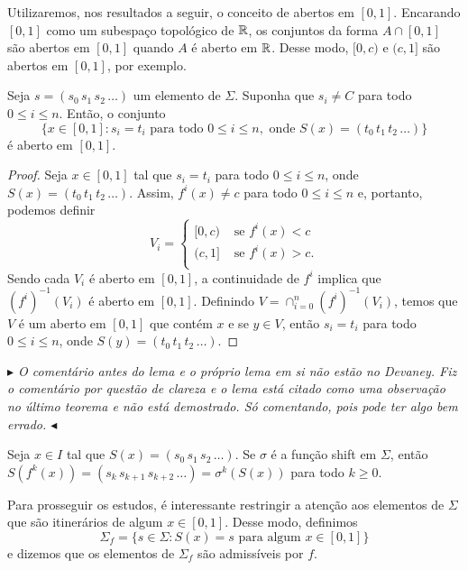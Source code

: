 Utilizaremos, nos resultados a seguir, o conceito de abertos em $[0, 1]$. Encarando $[0, 1]$ como um subespaço topológico de $\mathbb{R}$, os conjuntos da forma $A \cap [0, 1]$ são abertos em $[0, 1]$ quando $A$ é aberto em $\mathbb{R}$. Desse modo, $[0, c)$ e $(c, 1]$ são abertos em $[0, 1]$, por exemplo.

\begin{lemma}
Seja $s = (s_0\, s_1\, s_2\, \dots)$ um elemento de $\Sigma$. Suponha que $s_i \neq C$ para todo $0 \leq i \leq n$. Então, o conjunto
$$\{ x \in [0, 1] : s_i = t_i \textrm{ para todo } 0 \leq i \leq n, \text{ onde } S(x) = (t_0\, t_1\, t_2\, \dots) \}$$
é aberto em $[0, 1]$.
\end{lemma}

\begin{proof}
Seja $x \in [0, 1]$ tal que $s_i = t_i$ para todo $0 \leq i \leq n$, onde $S(x) = (t_0\, t_1\, t_2\, \dots)$. Assim, $f^i(x) \neq c$ para todo $0 \leq i \leq n$ e, portanto, podemos definir
\[ V_i = 
\begin{cases} 
  [0, c) & \textrm{ se } f^i(x) < c \\
  (c, 1] & \textrm{ se } f^i(x) > c. \\
\end{cases}
\]
Sendo cada $V_i$ é aberto em $[0, 1]$, a continuidade de $f^i$ implica que $(f^i)^{-1}(V_i)$ é aberto em $[0, 1]$. Definindo $V = \cap_{i=0}^n (f^i)^{-1}(V_i)$, temos que $V$ é um aberto em $[0, 1]$ que contém $x$ e se $y \in V$, então $s_i = t_i$ para todo $0 \leq i \leq n$, onde $S(y) = (t_0\, t_1\, t_2\, \dots)$.  
\end{proof}

\textit{$\blacktriangleright$ O comentário antes do lema e o próprio lema em si não estão no Devaney. Fiz o comentário por questão de clareza e o lema está citado como uma observação no último teorema e não está demostrado. Só comentando, pois pode ter algo bem errado. $\blacktriangleleft$}

Seja $x \in I$ tal que $S(x) = (s_0\, s_1\, s_2\, \dots)$. Se $\sigma$ é a função shift em $\Sigma$, então $S(f^k(x)) = (s_k\, s_{k+1}\, s_{k+2}\, \dots) = \sigma^k(S(x))$ para todo $k \geq 0$.

Para prosseguir os estudos, é interessante restringir a atenção aos elementos de $\Sigma$ que são itinerários de algum $x \in [0, 1]$. Desse modo, definimos
$$\Sigma_f = \{ s \in \Sigma : S(x) = s \text{ para algum } x \in [0, 1] \}$$
e dizemos que os elementos de $\Sigma_f$ são admissíveis por $f$.

